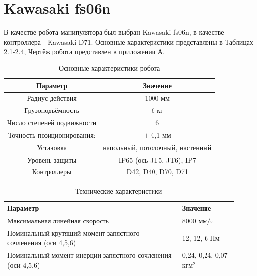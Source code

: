 \documentclass[a4paper,14pt,russian]{extreport} \usepackage{extsizes}
\begin{document}
	\section{Kawasaki fs06n}
		В качестве робота-манипулятора был выбран  Kawasaki fs06n, в качестве контроллера - Kawasaki D71.
		Основные характеристики представлены в Таблицах 2.1-2.4, Чертёж робота представлен в приложении А.
		\begin{table}[h!]
			\caption{Основные характеристики робота} 
			\label{tab_kaw_main}
			\centering
			\begin{tabular}{|c|c|}				
	        \hline Параметр & Значение  \\
	        \hline Радиус действия &	1000 мм \\
	        \hline Грузоподъёмность &	6 кг  \\ 
	        \hline Число степеней подвижности &	6 \\ 
	        \hline Точность позиционирования: &	$\pm$ 0,1 мм \\
	        \hline Установка &	напольный, потолочный, настенный \\
	        \hline Уровень защиты &	IP65 (ось JT5, JT6), IP7 \\
	        \hline Контроллеры &	D42, D40, D70, D71 \\
	        \hline
	        \end{tabular} 
	    \end{table}
	    	\begin{table}[h!]
	    		\caption{Технические характеристики} 
	    		\label{tab_kaw_teh}
	    		\centering
	    		\begin{tabular}{|p{0.7\linewidth}|p{0.22\linewidth}|}	
	    			\hline Параметр & Значение  \\
	    		    \hline 	Максимальная линейная скорость& 	8000 мм/c \\
	    			\hline Номинальный крутящий момент запястного сочленения (оси 4,5,6)	&	12, 12, 6 Нм\\
	    			\hline Номинальный момент инерции запястного сочленения (оси 4,5,6)	&	0,24, 0,24, 0,07 $кгм^2$\\
	    			\hline
	    		\end{tabular} 
	    	\end{table}
\end{document}
